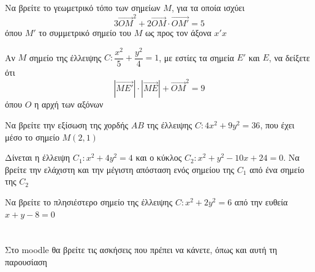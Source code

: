 \documentclass[greek]{beamer}
\begin{document}
\begin{askisi}
  Να βρείτε το γεωμετρικό τόπο των σημείων $Μ$, για τα οποία ισχύει
  $$3\overrightarrow{OM}^2+2\overrightarrow{OM}\cdot \overrightarrow{OM'}=5$$
  όπου $M'$ το συμμετρικό σημείο του $M$ ως προς τον άξονα $x'x$


\end{askisi}

\begin{askisi}
  Αν $Μ$ σημείο της έλλειψης $C:\dfrac{x^2}{5}+\dfrac{y^2}{4}=1$, με εστίες τα σημεία $Ε'$ και $Ε$, να δείξετε ότι
  $$|\overrightarrow{ΜΕ'}|\cdot |\overrightarrow{ΜΕ}|+\overrightarrow{ΟΜ}^2=9$$
  όπου $Ο$ η αρχή των αξόνων


\end{askisi}

\begin{askisi}
  Να βρείτε την εξίσωση της χορδής $ΑΒ$ της έλλειψης $C:4x^2+9y^2=36$, που έχει μέσο το σημείο $Μ(2,1)$


\end{askisi}

\begin{askisi}
  Δίνεται η έλλειψη $C_1:x^2+4y^2=4$ και ο κύκλος $C_2:x^2+y^2-10x+24=0$. Να βρείτε την ελάχιστη και την μέγιστη απόσταση ενός σημείου της $C_1$ από ένα σημείο της $C_2$


\end{askisi}

\begin{askisi}
  Να βρείτε το πλησιέστερο σημείο της έλλειψης $C:x^2+2y^2=6$ από την ευθεία $x+y-8=0$


\end{askisi}

\appendix

\section{}
\begin{frame}
  Στο moodle θα βρείτε τις ασκήσεις που πρέπει να κάνετε, όπως και αυτή τη παρουσίαση
\end{frame}
\end{document}
